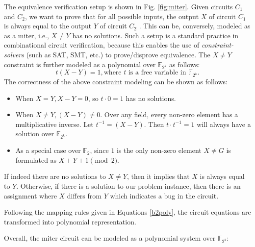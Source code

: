 The equivalence verification setup is shown in Fig. \ref{fig:miter}. 
Given circuits $C_{1}$ and $C_{2}$, 
we want to prove that for all possible inputs, 
the output $X$ of circuit $C_{1}$ is always equal to the output $Y$ of circuit $C_{2}$ . 
This can be, conversely, modeled as as a miter, i.e., $X \neq Y$ has no solutions. 
Such a setup is a standard practice in combinational circuit verification, 
because this enables the use of {\it constraint-solvers} (such as SAT, SMT, etc.) to prove/disprove equivalence. 
The $X\neq Y$ constraint is further modeled as a polynomial over
$\mathbb{F}_{2^k}$ as follows:
\begin{equation}
t(X - Y) = 1, \text{where $t$ is a free variable in }\mathbb{F}_{2^k}.  
\end{equation}
 The correctness of the above
constraint modeling can be shown as follows: 
\begin{itemize}
	\item When $X = Y, X-Y =0$, so $t\cdot 0 = 1$ has no solutions.
	\item When $X\neq Y, (X-Y) \neq 0$. Over any field, every non-zero element has a multiplicative
		inverse. Let $t^{-1} = (X-Y)$. Then $t \cdot t^{-1} = 1$ will always have a solution over $\mathbb{F}_{2^k}$.
	\item As a special case over $\mathbb{F}_2$, since $1$ is the only non-zero element $X\neq G$ is formulated as $X+Y+1 \pmod 2$.	
\end{itemize} 
If indeed there are no solutions to $X \neq Y$, then it
implies that $X$ is always equal to $Y$. Otherwise, 
if there is a solution to our problem instance, then there is an assignment where
$X$ differs from $Y$ which indicates a bug in the circuit.   

Following the mapping rules given in Equations \ref{b2poly}, 
the circuit equations are transformed into polynomial representation.

Overall, the miter circuit can be modeled as a polynomial system over $\mathbb{F}_{2^k}$:

